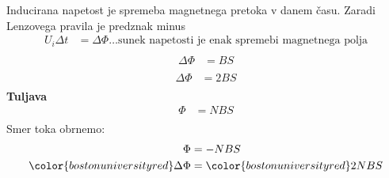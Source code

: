 Inducirana napetost je spremeba magnetnega pretoka v danem času. Zaradi Lenzovega pravila je predznak minus\\
\begin{align*}
	U_i \Delta t &= \Delta \Phi \dots \text{sunek napetosti je enak spremebi magnetnega polja}\\
\end{align*}
\begin{align*}
	\Delta \Phi &= BS\\
\end{align*}
\begin{align*}
	\Delta \Phi &= 2BS\\
\end{align*}
\textbf{Tuljava}\\
\begin{align*}
	\Phi &= NBS\\
\end{align*}
Smer toka obrnemo:\\
\begin{align*}
	\Phi &= -NBS\\
	{\color{bostonuniversityred}\Delta \Phi} &= {\color{bostonuniversityred}2NBS}\\
\end{align*}


